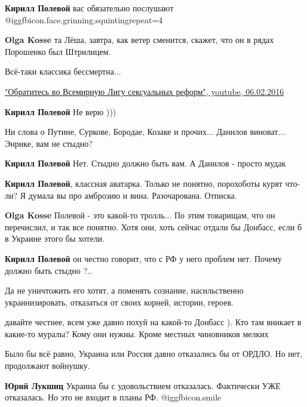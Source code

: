 \begin{itemize}
\begin{itemize}
\textbf{Кирилл Полевой} вас обязательно послушают  @igg{fbicon.face.grinning.squinting}{repeat=4} 

\textbf{Olga Kosse} та Лёша, завтра, как ветер сменится, скажет, что он в рядах Порошенко был Штрилицем.

Всё-таки классика бессмертна...

\href{https://youtu.be/V283SKrQ21o}{%
"Обратитесь во Всемирную Лигу сексуальных реформ", youtube, 06.02.2016%
}

\textbf{Кирилл Полевой} Не верю )))

\end{itemize} %


Ни слова о Путине, Суркове, Бородае, Козаке и прочих... Данилов виноват...
Энрике, вам не стыдно?

\begin{itemize} %
\textbf{Кирилл Полевой} Нет. Стыдно должно быть вам. А Данилов - просто мудак

\textbf{Кирилл Полевой}, классная аватарка. Только не понятно, порохоботы курят что-ли? Я думала вы про амброзию и вина. Разочарована. Отписка.

\textbf{Olga Kosse} Полевой - это какой-то тролль... По этим товарищам, что он перечислил, и так все понятно. Хотя они, хоть сейчас отдали бы Донбасс, если б в Украине этого бы хотели.

\textbf{Кирилл Полевой} он честно говорит, что с РФ у него проблем нет. Почему должно быть стыдно ?..
\end{itemize} %


Да не уничтожить его хотят, а поменять сознание, насильственно украинизировать,
отказаться от своих корней, истории, героев.

\begin{itemize} %
давайте честнее, всем уже давно похуй на какой-то Донбасс ). Кто там вникает в какие-то муралы? Кому они нужны. Кроме местных чиновников мелких

Было бы всё равно, Украина или Россия давно отказались бы от ОРДЛО. Но нет, продолжают войнушку.

\textbf{Юрий Лукшиц} Украина бы с удовольствием отказалась. Фактически УЖЕ отказалась. Но это не входит в планы РФ.  @igg{fbicon.smile} 
\end{itemize} %


\end{itemize} %
